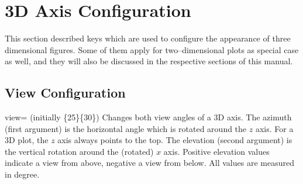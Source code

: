 

\section{3D Axis Configuration}
{
\label{sec:3d:axis:config}
%
This section described keys which are used to configure the appearance of three dimensional figures. Some of them apply for two--dimensional plots as special case as well, and they will also be discussed in the respective sections of this manual.

\subsection{View Configuration}
\begin{pgfplotskey}{view= (initially \{25\}\{30\})}
	Changes both view angles of a 3D axis. The azimuth (first argument) is the horizontal angle which is rotated around the $z$ axis. For a 3D plot, the $z$ axis always points to the top. The elevation (second argument) is the vertical rotation around the (rotated) $x$ axis. Positive elevation values indicate a view from above, negative a view from below. All values are measured in degree.

\pgfplotsexpensiveexample
\begin{codeexample}[]
\end{codeexample}

\pgfplotsexpensiveexample
\begin{codeexample}[]
\end{codeexample}

\pgfplotsexpensiveexample
\begin{codeexample}[]
\end{codeexample}


\end{pgfplotskey}}
